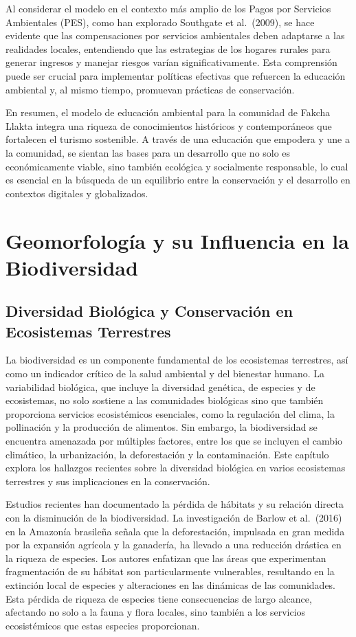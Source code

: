 \documentclass[
  letterpaper,
  DIV=11,
  numbers=noendperiod,
  oneside]{scrreprt}
\begin{document}
Al considerar el modelo en el contexto más amplio de los Pagos por
Servicios Ambientales (PES), como han explorado Southgate et al.~(2009),
se hace evidente que las compensaciones por servicios ambientales deben
adaptarse a las realidades locales, entendiendo que las estrategias de
los hogares rurales para generar ingresos y manejar riesgos varían
significativamente. Esta comprensión puede ser crucial para implementar
políticas efectivas que refuercen la educación ambiental y, al mismo
tiempo, promuevan prácticas de conservación.

En resumen, el modelo de educación ambiental para la comunidad de Fakcha
Llakta integra una riqueza de conocimientos históricos y contemporáneos
que fortalecen el turismo sostenible. A través de una educación que
empodera y une a la comunidad, se sientan las bases para un desarrollo
que no solo es económicamente viable, sino también ecológica y
socialmente responsable, lo cual es esencial en la búsqueda de un
equilibrio entre la conservación y el desarrollo en contextos digitales
y globalizados.

\chapter{Geomorfología y su Influencia en la
Biodiversidad}\label{geomorfologuxeda-y-su-influencia-en-la-biodiversidad}

\section{Diversidad Biológica y Conservación en Ecosistemas
Terrestres}\label{diversidad-bioluxf3gica-y-conservaciuxf3n-en-ecosistemas-terrestres}

La biodiversidad es un componente fundamental de los ecosistemas
terrestres, así como un indicador crítico de la salud ambiental y del
bienestar humano. La variabilidad biológica, que incluye la diversidad
genética, de especies y de ecosistemas, no solo sostiene a las
comunidades biológicas sino que también proporciona servicios
ecosistémicos esenciales, como la regulación del clima, la pollinación y
la producción de alimentos. Sin embargo, la biodiversidad se encuentra
amenazada por múltiples factores, entre los que se incluyen el cambio
climático, la urbanización, la deforestación y la contaminación. Este
capítulo explora los hallazgos recientes sobre la diversidad biológica
en varios ecosistemas terrestres y sus implicaciones en la conservación.

Estudios recientes han documentado la pérdida de hábitats y su relación
directa con la disminución de la biodiversidad. La investigación de
Barlow et al.~(2016) en la Amazonía brasileña señala que la
deforestación, impulsada en gran medida por la expansión agrícola y la
ganadería, ha llevado a una reducción drástica en la riqueza de
especies. Los autores enfatizan que las áreas que experimentan
fragmentación de su hábitat son particularmente vulnerables, resultando
en la extinción local de especies y alteraciones en las dinámicas de las
comunidades. Esta pérdida de riqueza de especies tiene consecuencias de
largo alcance, afectando no solo a la fauna y flora locales, sino
también a los servicios ecosistémicos que estas especies proporcionan.
\end{document}
